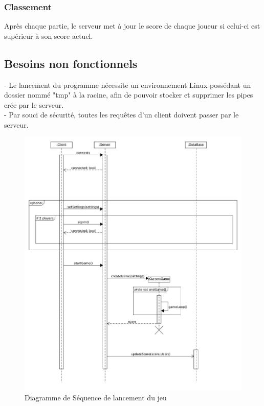 \documentclass[a4paper,12pt]{article}
\begin{document}
\subsubsection{Classement}

Après chaque partie, le serveur met à jour le score de chaque joueur si celui-ci est supérieur à son score actuel.

\subsection{Besoins non fonctionnels}

- Le lancement du programme nécessite un environnement Linux possédant un dossier nommé "tmp" à la racine, afin de pouvoir stocker et supprimer les pipes crée par le serveur.\\
- Par souci de sécurité, toutes les requêtes d'un client doivent passer par le serveur.


\begin{figure}[hbtp]
\centering
\includegraphics[scale=0.3]{images/sequence_diagram_StartGame}
\caption{Diagramme de Séquence de lancement du jeu}
\end{figure}
\end{document}
